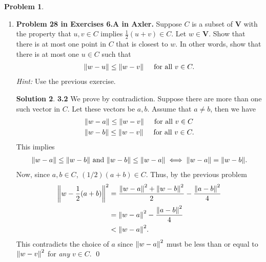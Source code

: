 \documentclass{article}
\theoremstyle{definition}
\newtheorem*{prob*}{Problem}
\newtheorem*{sln*}{Solution}
\newcommand{\V}{\mathbf{V}}
\begin{document}
\begin{prob*}
\begin{enumerate}
\begin{sln*}
		\end{sln*}
		
		
		
		\newpage
		
		
		
		\item \textbf{Problem 28 in Exercises 6.A in Axler.} Suppose $C$ is a subset of $\V$ with the property that $u,v \in C$ implies $\frac{1}{2}(u+v) \in C$. Let $w\in \V$. Show that there is at most one point in $C$ that is closest to $w$. In other words, show that there is at most one $u \in C$ such that
		\begin{align*}
		\norm{w-u} \leq \norm{w-v} \hspace{0.5cm} \text{for all } v\in C.
		\end{align*}
		\textit{Hint:} Use the previous exercise. 
		
		\begin{sln*}\textbf{3.2} 
			We prove by contradiction. Suppose there are more than one such vector in $C$. Let these vectors be $a,b$. Assume that $a\neq b$, then we have
			\begin{align*}
			&\norm{w-a} \leq \norm{w-v} \hspace{0.5cm} \text{for all } v\in C\\
			&\norm{w-b} \leq \norm{w-v} \hspace{0.5cm} \text{for all } v\in C.
			\end{align*}   
			This implies
			\begin{align*}
			\norm{w-a} \leq \norm{w-b} \text{ and } \norm{w-b} \leq \norm{w-a} \iff \norm{w-a} = \norm{w-b}.
			\end{align*}
			Now, since $a,b\in C$, $(1/2)(a+b) \in C$. Thus, by the previous problem
			\begin{align*}
			\norm{w - \frac{1}{2}(a+b)}^2 &= \frac{\norm{w-a}^2 + \norm{w-b}^2}{2} - \frac{\norm{a-b}^2}{4}\\ 
			&= \norm{w-a}^2 - \frac{\norm{a-b}^2}{4} \\
			&< \norm{w-a}^2.
			\end{align*}
			This contradicts the choice of $a$ since $\norm{w-a}^2$ must be less than or equal to $\norm{w-v}^2$ for \textit{any} $v\in C$. \qed
		\end{sln*}
		
		
	\end{enumerate}
	
\end{prob*}
\end{document}
